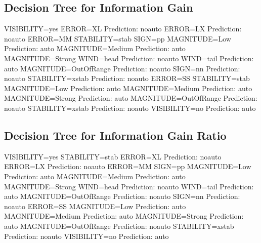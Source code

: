 \documentclass[]{article}   %
\begin{document}
\subsection{Decision Tree for Information Gain}
\begin{verbatimtab}[8]
  VISIBILITY=yes
    ERROR=XL
      Prediction: noauto
    ERROR=LX
      Prediction: noauto
    ERROR=MM
      STABILITY=stab
        SIGN=pp
          MAGNITUDE=Low
            Prediction: auto
          MAGNITUDE=Medium
            Prediction: auto
          MAGNITUDE=Strong
            WIND=head
              Prediction: noauto
            WIND=tail
              Prediction: auto
          MAGNITUDE=OutOfRange
            Prediction: noauto
        SIGN=nn
          Prediction: noauto
      STABILITY=xstab
        Prediction: noauto
    ERROR=SS
      STABILITY=stab
        MAGNITUDE=Low
          Prediction: auto
        MAGNITUDE=Medium
          Prediction: auto
        MAGNITUDE=Strong
          Prediction: auto
        MAGNITUDE=OutOfRange
          Prediction: noauto
      STABILITY=xstab
        Prediction: noauto
  VISIBILITY=no
    Prediction: auto
\end{verbatimtab}
\subsection{Decision Tree for Information Gain Ratio}
\begin{verbatimtab}[8]
  VISIBILITY=yes
    STABILITY=stab
      ERROR=XL
        Prediction: noauto
      ERROR=LX
        Prediction: noauto
      ERROR=MM
        SIGN=pp
          MAGNITUDE=Low
            Prediction: auto
          MAGNITUDE=Medium
            Prediction: auto
          MAGNITUDE=Strong
            WIND=head
              Prediction: noauto
            WIND=tail
              Prediction: auto
          MAGNITUDE=OutOfRange
            Prediction: noauto
        SIGN=nn
          Prediction: noauto
      ERROR=SS
        MAGNITUDE=Low
          Prediction: auto
        MAGNITUDE=Medium
          Prediction: auto
        MAGNITUDE=Strong
          Prediction: auto
        MAGNITUDE=OutOfRange
          Prediction: noauto
    STABILITY=xstab
      Prediction: noauto
  VISIBILITY=no
    Prediction: auto
\end{verbatimtab}
\end{document}
